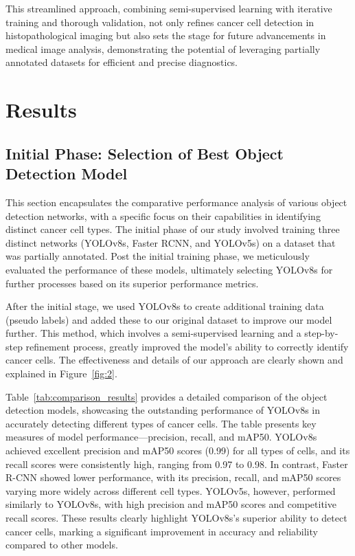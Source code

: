 \documentclass[anon]{midl} %
\begin{document}
This streamlined approach, combining semi-supervised learning with iterative training and thorough validation, not only refines cancer cell detection in histopathological imaging but also sets the stage for future advancements in medical image analysis, demonstrating the potential of leveraging partially annotated datasets for efficient and precise diagnostics.



\section{Results}
\subsection{Initial Phase: Selection of Best Object Detection Model}
This section encapsulates the comparative performance analysis of various object detection networks, with a specific focus on their capabilities in identifying distinct cancer cell types. The initial phase of our study involved training three distinct networks (YOLOv8s, Faster RCNN, and YOLOv5s) on a dataset that was partially annotated. Post the initial training phase, we meticulously evaluated the performance of these models, ultimately selecting YOLOv8s for further processes based on its superior performance metrics.

After the initial stage, we used YOLOv8s to create additional training data (pseudo labels) and added these to our original dataset to improve our model further. This method, which involves a semi-supervised learning and a step-by-step refinement process, greatly improved the model's ability to correctly identify cancer cells. The effectiveness and details of our approach are clearly shown and explained in Figure~\ref{fig:2}.

Table~\ref{tab:comparison_results} provides a detailed comparison of the object detection models, showcasing the outstanding performance of YOLOv8s in accurately detecting different types of cancer cells. The table presents key measures of model performance—precision, recall, and mAP50. YOLOv8s achieved excellent precision and mAP50 scores (0.99) for all types of cells, and its recall scores were consistently high, ranging from 0.97 to 0.98. In contrast, Faster R-CNN showed lower performance, with its precision, recall, and mAP50 scores varying more widely across different cell types. YOLOv5s, however, performed similarly to YOLOv8s, with high precision and mAP50 scores and competitive recall scores. These results clearly highlight YOLOv8s's superior ability to detect cancer cells, marking a significant improvement in accuracy and reliability compared to other models.
\end{document}
